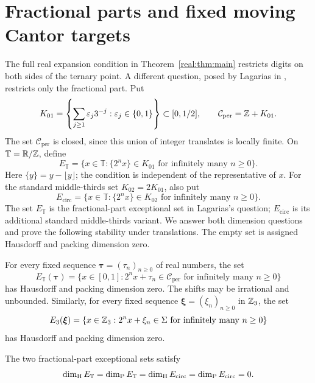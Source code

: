 \section{Fractional parts and fixed moving Cantor targets}
\label{circle:section}

The full real expansion condition in Theorem~\ref{real:thm:main}
restricts digits on both sides of the ternary point. A different question,
posed by Lagarias in \cite[Section~5]{LagariasArxiv}, restricts only the
fractional part. Put
\[
 K_{01}=\left\{\sum_{j\ge1}\varepsilon_j3^{-j}:
                    \varepsilon_j\in\{0,1\}\right\}\subset[0,1/2],
 \qquad \mathcal C_{\mathrm{per}}=\mathbb Z+K_{01}.
\]
The set $\mathcal C_{\mathrm{per}}$ is closed, since this union of
integer translates is locally finite. On $\mathbb T=\mathbb R/\mathbb Z$, define
\[
 E_{\mathbb T}=\{x\in\mathbb T:
                   \{2^nx\}\in K_{01}\text{ for infinitely many }n\ge0\}.
\]
Here $\{y\}=y-\lfloor y\rfloor$; the condition is independent of the
representative of $x$. For the standard middle-thirds set
$K_{02}=2K_{01}$, also put
\[
 E_{\mathrm{circ}}=\{x\in\mathbb T:
                 \{2^nx\}\in K_{02}\text{ for infinitely many }n\ge0\}.
\]
The set $E_{\mathbb T}$ is the fractional-part exceptional set in
Lagarias's question; $E_{\mathrm{circ}}$ is its additional standard
middle-thirds variant. We answer both dimension questions and prove
the following stability under translations.
The empty set is assigned
Hausdorff and packing dimension zero.

\begin{theorem}\label{circle:main}
For every fixed sequence $\boldsymbol\tau=(\tau_n)_{n\ge0}$ of real
numbers, the set
\[
 E_{\mathbb T}(\boldsymbol\tau)=
 \{x\in[0,1]:2^nx+\tau_n\in\mathcal C_{\mathrm{per}}
                        \text{ for infinitely many }n\ge0\}
\]
has Hausdorff and packing dimension zero. The shifts may be irrational
and unbounded. Similarly, for every fixed sequence
$\boldsymbol\xi=(\xi_n)_{n\ge0}$ in $\mathbb Z_3$, the set
\[
 E_3(\boldsymbol\xi)=
 \{x\in\mathbb Z_3:2^nx+\xi_n\in\Sigma
                        \text{ for infinitely many }n\ge0\}
\]
has Hausdorff and packing dimension zero.
\end{theorem}

\begin{corollary}\label{circle:cor:dimension}
The two fractional-part exceptional sets satisfy
\[
 \dim_{\mathrm H} E_{\mathbb T}=\dim_{\mathrm P} E_{\mathbb T}
 =\dim_{\mathrm H} E_{\mathrm{circ}}=\dim_{\mathrm P} E_{\mathrm{circ}}=0.
\]
\end{corollary}

